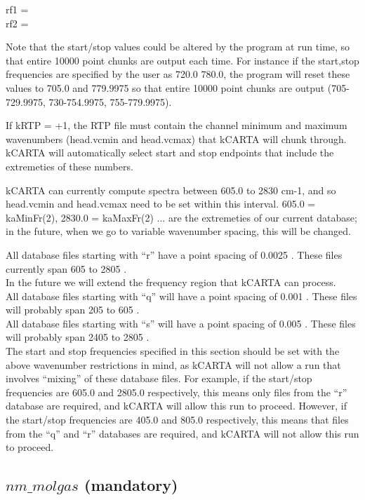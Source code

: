 \documentclass[12pt]{article}
\newcommand{\kc}{\textsf{kCARTA}\xspace}
\newcommand{\ttab}{\indent\indent}
\begin{document}
\medskip
{\sf
\ttab rf1 =  \\
\ttab rf2 = 
}
\medskip

Note that the start/stop values could be altered by the program at
run time, so that entire 10000 point chunks are output each time.  
For instance if the start,stop frequencies are specified by the user
as 720.0 780.0, the program will reset these values to 705.0 and
779.9975 so that entire 10000 point chunks are output (705-729.9975,
730-754.9975, 755-779.9975).

If kRTP = +1, the RTP file must contain the channel minimum and maximum 
wavenumbers (head.vcmin and head.vcmax) that \kc will chunk through. \kc will 
automatically select start and stop endpoints that include the extremeties of 
these numbers.

\kc can currently compute spectra between 605.0 to 2830 cm-1, and so 
head.vcmin and head.vcmax need to be set within this interval. 
605.0 = kaMinFr(2),  2830.0 = kaMaxFr(2) ... are the extremeties of our 
current database; in the future, when we go to variable wavenumber spacing, 
this will be changed. 

All database files starting with ``r'' have a point spacing of 0.0025 \wn.
These files currently span 605 to 2805 \wn.\\

In the future we will extend the frequency region that kCARTA can process.\\
All database files starting with ``q'' will have a point spacing of 0.001 \wn.
These files will probably span 205 to 605 \wn.\\
All database files starting with ``s'' will have a point spacing of 0.005 \wn.
These files will probably span 2405 to 2805 \wn.\\

The start and stop frequencies specified in this section should be set 
with the above wavenumber restrictions in mind, as kCARTA will not allow a run
that involves ``mixing'' of these database files. For example, if the 
start/stop frequencies are 605.0 and 2805.0 respectively, this means only files
from the ``r'' database are required, and kCARTA will allow this run to 
proceed. However, if the 
start/stop frequencies are 405.0 and 805.0 respectively, this means that files
from the ``q'' and ``r'' databases are required, and kCARTA will not allow 
this run to proceed. 

\subsection{$nm\_molgas$ (mandatory)}
\end{document}
